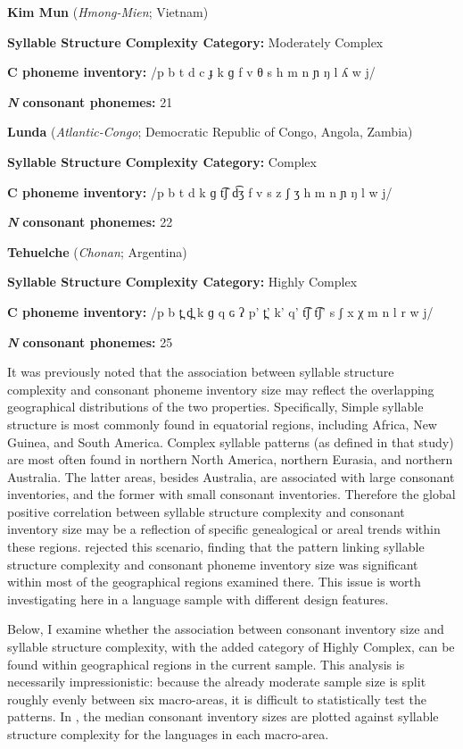 \ea\label{ex:4.23}
  \textbf{Kim Mun} (\textit{Hmong-Mien}; Vietnam)

\textbf{Syllable Structure Complexity Category:} Moderately Complex

\textbf{C phoneme inventory:} /p b t d c ɟ k ɡ f v θ s h m n ɲ ŋ l ʎ w j/

\textbf{\textit{N}} \textbf{consonant phonemes:} 21
\z

\ea\label{ex:4.24}
  \textbf{Lunda} (\textit{Atlantic-Congo}; Democratic Republic of Congo, Angola, Zambia)

\textbf{Syllable Structure Complexity Category:} Complex

\textbf{C phoneme inventory:} /p b t d k ɡ t͡ʃ d͡ʒ f v s z ʃ ʒ h m n ɲ ŋ l w j/

\textbf{\textit{N}} \textbf{consonant phonemes:} 22
\z

\ea\label{ex:4.25}
  \textbf{Tehuelche} (\textit{Chonan}; Argentina)

\textbf{Syllable Structure Complexity Category:} Highly Complex

\textbf{C phoneme inventory:} /p b t̪ d̪ k ɡ q ɢ ʔ p’ t̪’ k’ q’ t͡ʃ t͡ʃ’ s ʃ x χ m n l r w j/

\textbf{\textit{N}} \textbf{consonant phonemes:} 25
\z

  It was previously noted that the association between syllable structure complexity and consonant phoneme inventory size may reflect the overlapping geographical distributions of the two properties. Specifically, Simple syllable structure is most commonly found in equatorial regions, including Africa, New Guinea, and South America. Complex syllable patterns (as defined in that study) are most often found in northern North America, northern Eurasia, and northern Australia. The latter areas, besides Australia, are associated with large consonant inventories, and the former with small consonant inventories. Therefore the global positive correlation between syllable structure complexity and consonant inventory size may be a reflection of specific genealogical or areal trends within these regions. \citet{Maddieson2006} rejected this scenario, finding that the pattern linking syllable structure complexity and consonant phoneme inventory size was significant within most of the geographical regions examined there. This issue is worth investigating here in a language sample with different design features.

  Below, I examine whether the association between consonant inventory size and syllable structure complexity, with the added category of Highly Complex, can be found within geographical regions in the current sample. This analysis is necessarily impressionistic: because the already moderate sample size is split roughly evenly between six macro-areas, it is difficult to statistically test the patterns. In , the median consonant inventory sizes are plotted against syllable structure complexity for the languages in each macro-area.


